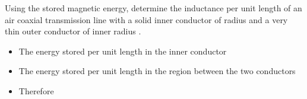 \begin{ELexample}{}

Using the stored magnetic energy, determine the inductance per unit length of an air coaxial transmission line with a solid inner conductor of radius  and a very thin outer conductor of inner radius .

\begin{ELsolution}

\begin{itemize}
\tightlist
\item
  The energy stored per unit length in the inner conductor
\end{itemize}


\begin{itemize}
\tightlist
\item
  The energy stored per unit length in the region between the two conductors
\end{itemize}


\begin{itemize}
\tightlist
\item
  Therefore
\end{itemize}


\end{ELsolution}

\end{ELexample}


